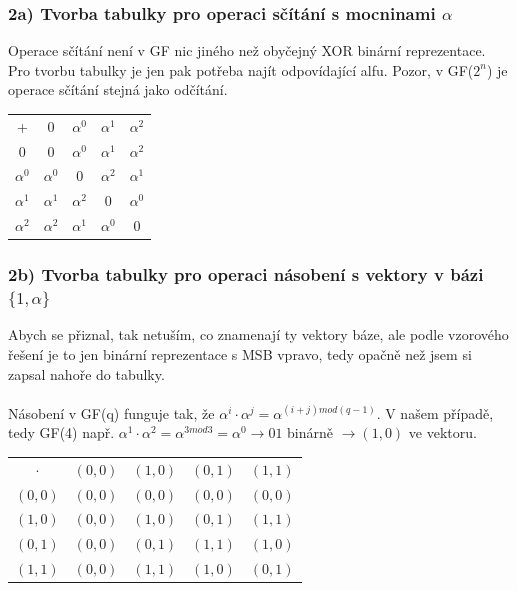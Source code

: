 \documentclass[10pt,a4paper]{article}
\begin{document}
\subsubsection*{2a) Tvorba tabulky pro operaci sčítání s mocninami $\alpha$}
Operace sčítání není v GF nic jiného než obyčejný XOR binární reprezentace. Pro tvorbu tabulky je jen pak potřeba najít odpovídající alfu. Pozor, v GF($2^{n}$) je operace sčítání stejná jako odčítání.
\begin{table}[h]
	\centering
	\begin{tabular}{|c||c|c|c|c|}
		\hline
		+ & 0& $\alpha^{0}$ & $\alpha^{1}$ & $\alpha^{2}$ \\\hhline{|==|=|=|=|}
		0 &  0 & $\alpha^{0}$ & $\alpha^{1}$ & $\alpha^{2}$ \\\hline 
		$\alpha^{0}$ & $\alpha^{0}$ & 0 & $\alpha^{2}$ & $\alpha^{1}$ \\\hline 
		$\alpha^{1}$ & $\alpha^{1}$ & $\alpha^{2}$ & 0 & $\alpha^{0}$ \\\hline 
		$\alpha^{2}$ & $\alpha^{2}$ & $\alpha^{1}$ & $\alpha^{0}$ & 0 \\\hline 
	\end{tabular}
\end{table}
\newpage
\subsubsection*{2b) Tvorba tabulky pro operaci násobení s vektory v bázi $\lbrace 1,\alpha \rbrace$}
Abych se přiznal, tak netuším, co znamenají ty vektory báze, ale podle vzorového řešení je to jen binární reprezentace s MSB vpravo, tedy opačně než jsem si zapsal nahoře do tabulky. \\\\
Násobení v GF(q) funguje tak, že $\alpha^{i}\cdot\alpha^{j} = \alpha^{(i+j) mod (q-1)}$.
V našem případě, tedy GF(4) např. $\alpha^{1}\cdot\alpha^{2} = \alpha^{3 mod 3} = \alpha^{0} \to 01$ binárně $\to (1,0)$ ve vektoru.
\begin{table}[h]
	\centering
	\begin{tabular}{|c||c|c|c|c|}
		\hline
		$\cdot$ & $(0,0)$& $(1,0)$ & $(0,1)$ & $(1,1)$ \\\hhline{|==|=|=|=|}
		$(0,0)$ & $(0,0)$ & $(0,0)$ & $(0,0)$ & $(0,0)$ \\\hline 
		$(1,0)$ & $(0,0)$ & $(1,0)$ & $(0,1)$ & $(1,1)$ \\\hline 
		$(0,1)$ & $(0,0)$ & $(0,1)$ & $(1,1)$ & $(1,0)$ \\\hline 
		$(1,1)$ & $(0,0)$ & $(1,1)$ & $(1,0)$ & $(0,1)$ \\\hline 
	\end{tabular}
\end{table}
\end{document}
